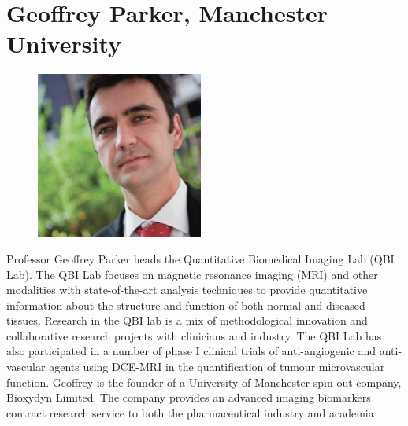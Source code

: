 \documentclass[a5paper,10pt,twoside,onecolumn,openany,helvetica,showtrims]{memoir}
\newlength{\SpeakerSize}
\begin{document}
\section*{Geoffrey Parker, Manchester University}
\begin{figure}
\includegraphics[width=\SpeakerSize]{SpeakerPics/image5}	
\end{figure}
Professor Geoffrey Parker heads the Quantitative Biomedical Imaging Lab (QBI Lab). The QBI Lab focuses on magnetic resonance imaging (MRI) and other modalities with state-of-the-art analysis techniques to provide quantitative information about the structure and function of both normal and diseased tissues. Research in the QBI lab is a mix of methodological innovation and collaborative research projects with clinicians and industry. The QBI Lab has also participated in a number of phase I clinical trials of anti-angiogenic and anti-vascular agents using DCE-MRI in the quantification of tumour microvascular function. Geoffrey is the founder of a University of Manchester spin out company, Bioxydyn Limited. The company provides an advanced imaging biomarkers contract research service to both the pharmaceutical industry and academia
\end{document}

